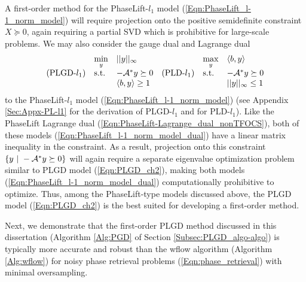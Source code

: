 A first-order method for the PhaseLift-$l_1$ model (\ref{Eqn:PhaseLift_l-1_norm_model}) will require projection onto the positive semidefinite constraint $X \succeq 0$, again requiring a partial SVD which is prohibitive for large-scale problems.  We may also consider the gauge dual and Lagrange dual
\begin{equation} 			\label{Eqn:PhaseLift_l-1_norm_model_dual}
\begin{array}{llllll}

	&	\min\limits_{y}
		&	||y||_\infty
			&&	\max\limits_y
				& \langle b, y \rangle
					\\
			
(\textnormal{PLGD-}l_1)		

	&	\textnormal{s.t.}
		&	-{\mathcal A}^*y \succeq 0
			&(\textnormal{PLD-}l_1)&	\textnormal{s.t.}
				&	- {\mathcal A}^*y \succeq 0
					\\
			
			&&	\langle b, y \rangle \geq 1 &&&	||y||_\infty \leq 1
\end{array}
\end{equation}
to the PhaseLift-$l_1$ model (\ref{Eqn:PhaseLift_l-1_norm_model}) 
(see Appendix \ref{Sec:Appx-PL-l1} for the derivation of PLGD-$l_1$ and  \cite[Chapter 5]{boyd2004convex} for PLD-$l_1$).   
Like the PhaseLift Lagrange dual (\ref{Eqn:PhaseLift-Lagrange_dual_nonTFOCS}), 
both of these models (\ref{Eqn:PhaseLift_l-1_norm_model_dual}) have a linear matrix inequality in the constraint.
As a result, projection onto this constraint $\{ y \ | \ -\caA^*y \succeq 0 \}$ will again require a separate eigenvalue optimization problem similar to PLGD model (\ref{Eqn:PLGD_ch2}), making both models (\ref{Eqn:PhaseLift_l-1_norm_model_dual}) computationally prohibitive to optimize.
Thus, among the PhaseLift-type models discussed above, the PLGD model (\ref{Eqn:PLGD_ch2}) is the best suited for developing a first-order method.







Next, we demonstrate that the first-order PLGD method discussed in this dissertation (Algorithm \ref{Alg:PGD} of Section \ref{Subsec:PLGD_algo-algo}) is typically more accurate and robust than the wflow algorithm (Algorithm \ref{Alg:wflow}) for noisy phase retrieval problems (\ref{Eqn:phase_retrieval}) with minimal oversampling.


